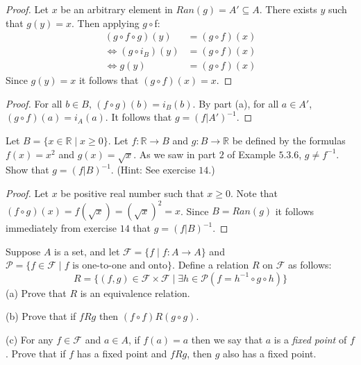 \begin{proof}
    Let $x$ be an arbitrary element in $Ran(g) = A' \subseteq A$.
    There exists $y$ such that $g(y) = x$.
    Then applying $g \circ $f:
    \begin{align*}
        (g \circ f \circ g)(y) &= (g \circ f)(x) \\
        \iff (g \circ i_B)(y) &= (g \circ f)(x) \\
        \iff g(y) &= (g \circ f)(x)
    \end{align*}
    Since $g(y) = x$ it follows that $(g \circ f)(x) = x$.
\end{proof}

\begin{proof}
    For all $b \in B$, $(f \circ g)(b) = i_B(b)$.
    By part (a), for all $a \in A'$, $(g \circ f)(a) = i_A(a)$.
    It follows that $g = (f | A')^{-1}$.
\end{proof}

\begin{tcolorbox}[title=Problem 15, breakable]
    Let $B = \{x \in \mathbb{R} \mid x \ge 0\}$.
    Let $f : \mathbb{R} \rightarrow B$ and $g : B \rightarrow \mathbb{R}$
    be defined by the formulas $f(x) = x^2$ and $g(x) = \sqrt{x}$.
    As we saw in part $2$ of Example $5.3.6$, $g \ne f^{-1}$.
    Show that $g = (f | B)^{-1}$.
    (Hint: See exercise $14$.)
\end{tcolorbox}

\begin{proof}
    Let $x$ be positive real number such  that $x \ge 0$.
    Note that $(f \circ g)(x) = f(\sqrt{x}) = (\sqrt{x})^2 = x$.
    Since $B = Ran(g)$ it follows immediately from exercise $14$
        that $g = (f | B)^{-1}$.
\end{proof}

\begin{tcolorbox}[title=Problem 17, breakable]
    Suppose $A$ is a set, and let $\mathcal{F} = \{f \mid f : A \rightarrow A\}$
    and $\mathcal{P} = \{f \in \mathcal{F} \mid f \text{ is one-to-one and onto}\}$.
    Define a relation $R$ on $\mathcal{F}$ as follows:
    \[R = \{(f, g) \in \mathcal{F} \times \mathcal{F} \mid \exists{h} \in \mathcal{P}(f = h^{-1} \circ g \circ h)\}\]
    (a) Prove that $R$ is an equivalence relation.

    (b) Prove that if $f R g$ then $(f \circ f) R (g \circ g)$.

    (c) For any $f \in \mathcal{F}$ and $a \in A$, if $f(a) = a$ then we say that $a$
        is a \emph{fixed point} of $f$. Prove that if $f$ has a fixed point and $f R g$,
        then $g$ also has a fixed point.
\end{tcolorbox}

